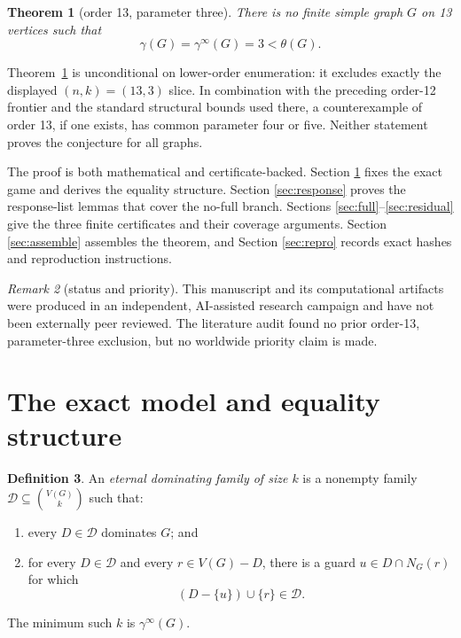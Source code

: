 \documentclass[11pt]{article}
\newtheorem{theorem}{Theorem}[section]
\theoremstyle{definition}
\newtheorem{definition}[theorem]{Definition}
\theoremstyle{remark}
\newtheorem{remark}[theorem]{Remark}
\newcommand{\gaminf}{\gamma^{\infty}}
\newcommand{\V}{V}
\begin{document}
\begin{theorem}[order 13, parameter three]\label{thm:main}
There is no finite simple graph \(G\) on 13 vertices such that
\[
  \gamma(G)=\gaminf(G)=3<\theta(G).
\tag{1.3}
\]
\end{theorem}

Theorem~\ref{thm:main} is unconditional on lower-order enumeration: it
excludes exactly the displayed \((n,k)=(13,3)\) slice.  In combination with
the preceding order-12 frontier and the standard structural bounds used
there, a counterexample of order 13, if one exists, has common parameter
four or five.  Neither statement proves the conjecture for all graphs.

The proof is both mathematical and certificate-backed.  Section
\ref{sec:model} fixes the exact game and derives the equality structure.
Section \ref{sec:response} proves the response-list lemmas that cover the
no-full branch.  Sections \ref{sec:full}--\ref{sec:residual} give the three
finite certificates and their coverage arguments.  Section
\ref{sec:assemble} assembles the theorem, and Section \ref{sec:repro}
records exact hashes and reproduction instructions.

\begin{remark}[status and priority]\label{rem:status}
This manuscript and its computational artifacts were produced in an
independent, AI-assisted research campaign and have not been externally
peer reviewed.  The literature audit found no prior order-13,
parameter-three exclusion, but no worldwide priority claim is made.
\end{remark}

\section{\hspace{0.5em}The exact model and equality structure}\label{sec:model}

\begin{definition}\label{def:family}
An \emph{eternal dominating family of size \(k\)} is a nonempty family
\(\mathcal D\subseteq\binom{\V(G)}k\) such that:
\begin{enumerate}
\item every \(D\in\mathcal D\) dominates \(G\); and
\item for every \(D\in\mathcal D\) and every \(r\in\V(G)-D\), there is a
      guard \(u\in D\cap N_G(r)\) for which
      \[
        (D-\{u\})\cup\{r\}\in\mathcal D.
      \tag{2.1}
      \]
\end{enumerate}
The minimum such \(k\) is \(\gaminf(G)\).
\end{definition}
\end{document}
